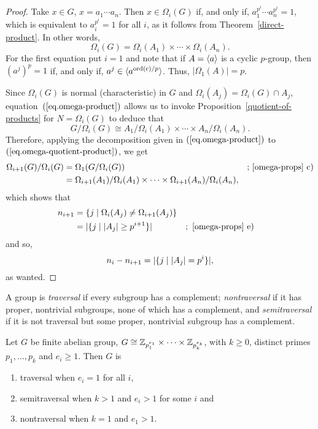 \begin{proof} Take $x\in G$, $x=a_1\cdots a_n$. Then $x\in\Omega_i(G)$ if, and only if, $a_1^{p^i}\cdots a_n^{p^i}=1$, which is equivalent to $a_i^{p^i}=1$ for all $i$, as it follows from Theorem~\ref{direct-product}. In other words,
\begin{equation}\label{eq.omega-product}
    \Omega_i(G) = \Omega_i(A_1)\times\cdots\times\Omega_i(A_n).
\end{equation}
For the first equation put $i=1$ and note that if $A=\langle a\rangle$ is a cyclic $p$-group, then $(a^j)^p=1$ if, and only if, $a^j\in\langle a^{{\rm ord}(c)/p}\rangle$. Thus, $|\Omega_1(A)|=p$.

Since $\Omega_i(G)$ is normal (characteristic) in $G$ and $\Omega_i(A_j) =\Omega_i(G)\cap A_j$, equation~$(\ref{eq.omega-product})$ allows us to invoke Proposition~\ref{quotient-of-products} for $N=\Omega_i(G)$ to deduce that
\begin{equation}\label{eq.omega-quotient-product}
    G/\Omega_i(G) \cong A_1/\Omega_i(A_1)\times\cdots\times A_n/\Omega_i(A_n).
\end{equation}
Therefore, applying the decomposition given in $(\ref{eq.omega-product})$ to $(\ref{eq.omega-quotient-product})$, we get
\begin{align*}
    \Omega_{i+1}(G)/\Omega_i(G) &= \Omega_1(G/\Omega_i(G))
                &&\text{; \ref{omega-props} c)}\\
        &= \Omega_{i+1}(A_1)/\Omega_i(A_1)\times\cdots\times
            \Omega_{i+1}(A_n)/\Omega_i(A_n),
\end{align*}
which shows that
\begin{align*}
    n_{i+1} &= \set{j\mid \Omega_i(A_j)\ne\Omega_{i+1}(A_j)}\\
        &= |\set{j\mid|A_j|\ge p^{i+1}}| &&\rm;\ \ref{omega-props}~e)
\end{align*}
and so,
$$
    n_i - n_{i+1} = |\{j\mid|A_j|=p^i\}|,
$$
as wanted.  \end{proof}

\begin{defn}
    A group is \textsl{traversal} if every subgroup has a complement; \textsl{nontraversal} if it has proper, nontrivial subgroups, none of which has a complement, and \textsl{semitraversal} if it is not traversal but some proper, nontrivial subgroup has a complement.
\end{defn}

\begin{thm}
    Let\/ $G$ be finite abelian group, $G\cong \mathbb{Z}_{p_1^{e_1}}\times\cdots\times\mathbb{Z}_{p_k^{e_k}}$, with\/ $k\ge 0$, distinct primes\/ $p_1,\dots,p_k$ and\/ $e_i\ge1$. Then\/ $G$ is
    \begin{enumerate}[\rm a)]
        \item traversal when\/ $e_i=1$ for all\/ $i$,
        \item semitraversal when\/ $k>1$ and\/ $e_i>1$ for some\/ $i$ and
        \item nontraversal when\/ $k=1$ and\/ $e_1>1$.
    \end{enumerate}
\end{thm}

